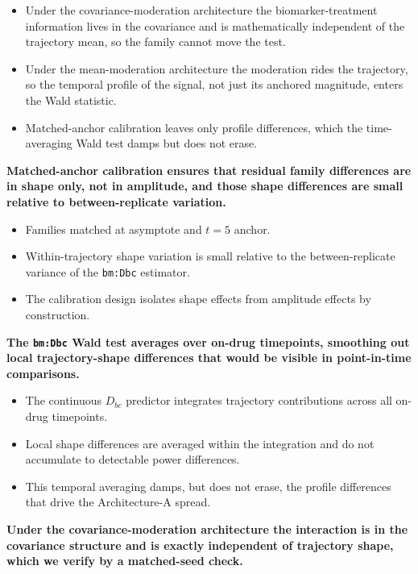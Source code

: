 \documentclass[
  11pt,
]{article}
\begin{document}
\begin{itemize}\setlength{\itemsep}{2pt}\setlength{\parskip}{0pt}
\item Under the covariance-moderation architecture the biomarker-treatment information
  lives in the covariance and is mathematically independent of
  the trajectory mean, so the family cannot move the test.
\item Under the mean-moderation architecture the moderation rides the trajectory,
  so the temporal profile of the signal, not just its anchored
  magnitude, enters the Wald statistic.
\item Matched-anchor calibration leaves only profile differences,
  which the time-averaging Wald test damps but does not erase.
\end{itemize}

\textbf{Matched-anchor calibration ensures that residual family
differences are in shape only, not in amplitude, and those
shape differences are small relative to between-replicate
variation.}

\begin{itemize}\setlength{\itemsep}{2pt}\setlength{\parskip}{0pt}
\item Families matched at asymptote and $t = 5$ anchor.
\item Within-trajectory shape variation is small relative to
  the between-replicate variance of the \texttt{bm:Dbc} estimator.
\item The calibration design isolates shape effects from
  amplitude effects by construction.
\end{itemize}

\textbf{The \texttt{bm:Dbc} Wald test averages over on-drug timepoints,
smoothing out local trajectory-shape differences that would be
visible in point-in-time comparisons.}

\begin{itemize}\setlength{\itemsep}{2pt}\setlength{\parskip}{0pt}
\item The continuous $D_{bc}$ predictor integrates trajectory
  contributions across all on-drug timepoints.
\item Local shape differences are averaged within the
  integration and do not accumulate to detectable power
  differences.
\item This temporal averaging damps, but does not erase, the
  profile differences that drive the Architecture-A spread.
\end{itemize}

\textbf{Under the covariance-moderation architecture the interaction is in the
covariance structure and is exactly independent of trajectory
shape, which we verify by a matched-seed check.}
\end{document}
